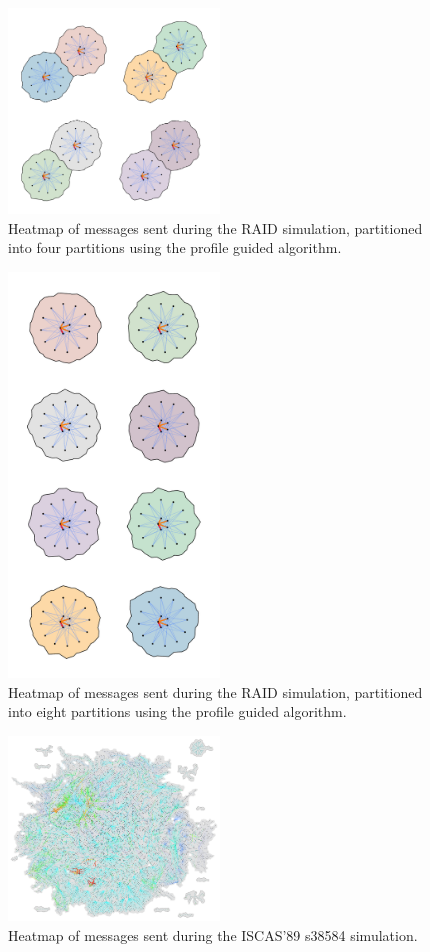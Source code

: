 \documentclass[11pt]{book}
\begin{document}
\begin{figure}
\centering
\includegraphics[clip=true,width=0.5\textwidth]{figs/RAID_4part.pdf}
\caption{Heatmap of messages sent during the RAID simulation, partitioned into four partitions using the profile guided algorithm.}
\end{figure}

\begin{figure}
\centering
\includegraphics[clip=true,width=0.5\textwidth]{figs/RAID_8part.pdf}
\caption{Heatmap of messages sent during the RAID simulation, partitioned into eight partitions using the profile guided algorithm.}
\end{figure}

\begin{figure}
\centering
\includegraphics[clip=true,width=0.5\textwidth]{figs/s38584.pdf}
\caption{Heatmap of messages sent during the ISCAS'89 s38584 simulation.}
\end{figure}
\end{document}
